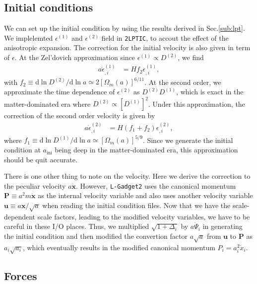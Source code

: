 \documentclass[a4paper,11pt]{article}
\renewcommand{\d}{\mathrm{d}}
\newcommand{\vx}{{\bm x}}
\newcommand{\vu}{{\bm u}}
\newcommand{\vP}{{\bm P}}
\begin{document}
\subsection{Initial conditions}
\label{sub:ics}

We can set up the initial condition by using the results derived in Sec.\ref{sub:lpt}.
We implelemted $\epsilon^{(1)}$ and $\epsilon^{(2)}$ field in \texttt{2LPTIC},
to accout the effect of the anisotropic expansion.
The correction for the initial velocity is also given in term of $\epsilon$.
At the Zel'dovich approximation since $\epsilon^{(1)}\propto D^{(2)}$, we find
\begin{align}
    a\dot\epsilon^{(1)}_{,i} &=  H f_2 \epsilon^{(1)}_{,i},
    \label{eq:vel_ZA}
\end{align}
with $f_2\equiv \d \ln D^{(2)}/\d \ln a \simeq 2[\Omega_m(a)]^{6/11}$.
At the second order, we approximate the time dependence of $\epsilon^{(2)}$ as $D^{(2)}D^{(1)}$,
which is exact in the matter-dominated era where $D^{(2)}\propto [D^{(1)}]^2$.
Under this approximation, the correction of the second order velocity is given by
\begin{align}
    a\dot\epsilon^{(2)}_{,i} &=  H (f_1 + f_2 )\epsilon^{(2)}_{,i},
    \label{eq:vel_2LPT}
\end{align}
where $f_1\equiv \d \ln D^{(1)}/\d \ln a \simeq [\Omega_m(a)]^{5/9}$.
Since we generate the initial condition at $a_\mathrm{ini}$ being deep in the matter-dominated era,
this approximation should be quit accurate.

There is one other thing to note on the velocity. Here we derive the correction to the peculiar velocity $a\dot \vx$.
However, \texttt{L-Gadget2} uses the canonical momentum $\vP \equiv a^2m\dot \vx$ as the internal velocity  variable
and also uses another velocity variable $\vu \equiv a\vx/\sqrt{a}$ when reading the initial condition files.
Now that we have the scale-dependent scale factors, leading to the modified velocity variables,
we have to be careful in these I/O places.
Thus, we multiplied $\sqrt{1+\Delta_i}$ by $a\dot\Psi_i$ in generating the initial condition and
then modified the convertion factor $a\sqrt{a}$ from $\vu$ to $\vP$ as $a_i\sqrt{a_i}$,
which eventually results in the modified canonical momentum $P_i=a_i^2\dot x_i$.

\subsection{Forces}
\label{sub:treepm}
\end{document}

